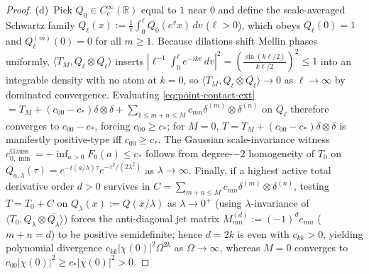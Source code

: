 \documentclass[11pt,a4paper]{article}
\theoremstyle{definition}
\theoremstyle{remark}
\newcommand{\bbR}{\mathbb{R}}
\newcommand{\1}{\mathbf{1}}
\begin{document}
\begin{proof}
(d)~Pick $Q_0\in C_c^\infty(\bbR)$ equal to $1$ near $0$ and define the scale-averaged Schwartz family $Q_\ell(x) := \frac{1}{\ell}\int_0^\ell Q_0(e^v x)\,dv$ ($\ell>0$), which obeys $Q_\ell(0)=1$ and $Q_\ell^{(m)}(0)=0$ for all $m\ge 1$. Because dilations shift Mellin phases uniformly, $\langle T_M, Q_\ell\otimes\overline{Q_\ell}\rangle$ inserts $|\ell^{-1}\int_0^\ell e^{-ikv}\,dv|^2 = (\frac{\sin(k\ell/2)}{k\ell/2})^2 \le 1$ into an integrable density with no atom at $k=0$, so $\langle T_M, Q_\ell\otimes\overline{Q_\ell}\rangle\to 0$ as $\ell\to\infty$ by dominated convergence. Evaluating \eqref{eq:point-contact-ext} $= T_M + (c_{00}-c_*)\delta\otimes\delta + \sum_{1\le m+n\le M}c_{mn}\delta^{(m)}\otimes\delta^{(n)}$ on $Q_\ell$ therefore converges to $c_{00}-c_*$, forcing $c_{00}\ge c_*$; for $M=0$, $T = T_M + (c_{00}-c_*)\delta\otimes\delta$ is manifestly positive-type iff $c_{00}\ge c_*$. The Gaussian scale-invariance witness $c_{0,\min}^{\mathrm{Gauss}} = -\inf_{a>0}F_0(a)\le c_*$ follows from degree-$-2$ homogeneity of $T_0$ on $Q_{a,\lambda}(\tau)=e^{-i(a/\lambda)\tau}e^{-\tau^2/(2\lambda^2)}$ as $\lambda\to\infty$. Finally, if a highest active total derivative order $d>0$ survives in $C=\sum_{m+n\le M}c_{mn}\delta^{(m)}\otimes\delta^{(n)}$, testing $T=T_0+C$ on $Q_\lambda(x):=Q(x/\lambda)$ as $\lambda\to 0^+$ (using $\lambda$-invariance of $\langle T_0,Q_\lambda\otimes\overline{Q_\lambda}\rangle$) forces the anti-diagonal jet matrix $M^{(d)}_{mn}:=(-1)^d c_{mn}$ ($m+n=d$) to be positive semidefinite; hence $d=2k$ is even with $c_{kk}>0$, yielding polynomial divergence $c_{kk}|\chi(0)|^2\Omega^{2k}$ as $\Omega\to\infty$, whereas $M=0$ converges to $c_{00}|\chi(0)|^2\ge c_*|\chi(0)|^2 > 0$.

\end{proof}
\end{document}
